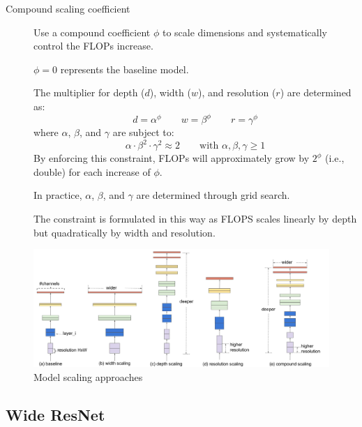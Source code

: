 \begin{description}
        \begin{description}
            \item[Compound scaling coefficient]
                Use a compound coefficient $\phi$ to scale dimensions and systematically control the FLOPs increase.
                \begin{remark}
                    $\phi=0$ represents the baseline model.
                \end{remark}

                The multiplier for depth ($d$), width ($w$), and resolution ($r$) are determined as:
                \[ d = \alpha^\phi \qquad w = \beta^\phi \qquad r = \gamma^\phi \]
                where $\alpha$, $\beta$, and $\gamma$ are subject to:
                \[ \alpha \cdot \beta^2 \cdot \gamma^2 \approx 2 \qquad \text{with } \alpha, \beta, \gamma \geq 1 \]
                By enforcing this constraint, FLOPs will approximately grow by $2^\phi$ (i.e., double) for each increase of $\phi$. 

                In practice, $\alpha$, $\beta$, and $\gamma$ are determined through grid search.

                \begin{remark}
                    The constraint is formulated in this way as FLOPS scales linearly by depth but quadratically by width and resolution.
                \end{remark}
        \end{description}
\end{description}

\begin{figure}[H]
    \centering
    \includegraphics[width=0.95\linewidth]{./img/_model_scaling.jpg}
    \caption{Model scaling approaches}
\end{figure}


\subsection{Wide ResNet}

